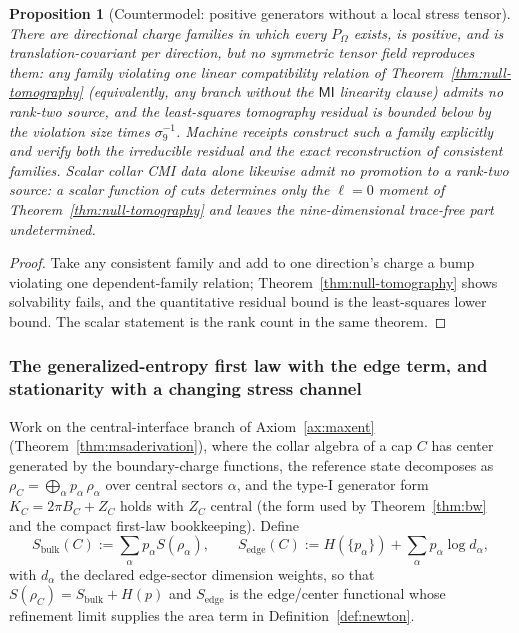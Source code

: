 \documentclass[11pt]{article}
\newtheorem{proposition}[theorem]{Proposition}
\begin{document}
\begin{proposition}[Countermodel: positive generators without a local stress tensor]
\label{prop:no-local-stress-countermodel}
There are directional charge families in which every \(P_\Omega\) exists,
is positive, and is translation-covariant \emph{per direction}, but no
symmetric tensor field reproduces them: any family violating one linear
compatibility relation of Theorem~\ref{thm:null-tomography} (equivalently,
any branch without the \(\mathsf{MI}\) linearity clause) admits no rank-two
source, and the least-squares tomography residual is bounded below by the
violation size times \(\sigma_9^{-1}\). Machine receipts construct such a
family explicitly and verify both the irreducible residual and the exact
reconstruction of consistent families. Scalar
collar CMI data alone likewise admit no promotion to a rank-two source: a
scalar function of cuts determines only the \(\ell=0\) moment of
Theorem~\ref{thm:null-tomography} and leaves the nine-dimensional trace-free
part undetermined.
\end{proposition}

\begin{proof}
Take any consistent family and add to one direction's charge a bump violating
one dependent-family relation; Theorem~\ref{thm:null-tomography} shows
solvability fails, and the quantitative residual bound is the least-squares
lower bound. The scalar statement is the rank count in the same theorem.
\end{proof}

\subsubsection{The generalized-entropy first law with the edge term, and stationarity with a changing stress channel}
\label{subsubsec:entropy-bridge-repair}

Work on the central-interface branch of Axiom~\ref{ax:maxent}
(Theorem~\ref{thm:msaderivation}), where the collar algebra of a cap \(C\)
has center generated by the boundary-charge functions, the reference state
decomposes as \(\rho_C=\bigoplus_\alpha p_\alpha\,\rho_\alpha\) over central
sectors \(\alpha\), and the type-I generator form
\(K_C=2\pi B_C+Z_C\) holds with \(Z_C\) central
(the form used by Theorem~\ref{thm:bw} and the compact first-law
bookkeeping). Define
\[
S_{\mathrm{bulk}}(C):=\sum_\alpha p_\alpha S(\rho_\alpha),
\qquad
S_{\mathrm{edge}}(C):=H(\{p_\alpha\})+\sum_\alpha p_\alpha\log d_\alpha ,
\]
with \(d_\alpha\) the declared edge-sector dimension weights, so that
\(S(\rho_C)=S_{\mathrm{bulk}}+H(p)\) and \(S_{\mathrm{edge}}\) is the
edge/center functional whose refinement limit supplies the area term in
Definition~\ref{def:newton}.
\end{document}

